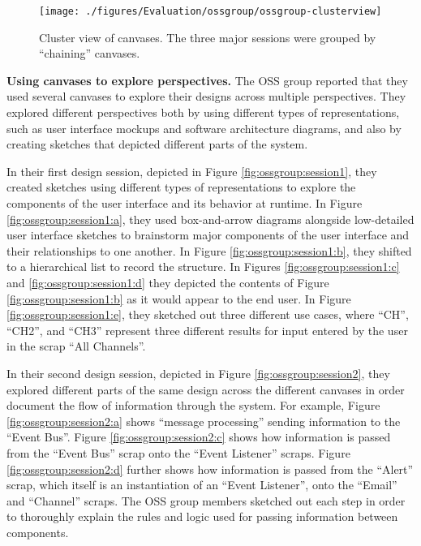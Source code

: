 \begin{figure}%
  \centering
  \texttt{[image: ./figures/Evaluation/ossgroup/ossgroup-clusterview]}
   \caption {Cluster view of canvases. The three major sessions were grouped by ``chaining'' canvases.}
   \label{fig:ossgroup:clusterview}   
\end{figure}%

\textbf{Using canvases to explore perspectives.} The OSS group reported that they used several canvases to explore their designs across multiple perspectives. They explored different perspectives both by using different types of representations, such as user interface mockups and software architecture diagrams, and also by creating sketches that depicted different parts of the system. 

In their first design session, depicted in Figure \ref{fig:ossgroup:session1}, they created sketches using different types of representations to explore the components of the user interface and its behavior at runtime. In Figure \ref{fig:ossgroup:session1:a}, they used box-and-arrow diagrams alongside low-detailed user interface sketches to brainstorm major components of the user interface and their relationships to one another. In Figure \ref{fig:ossgroup:session1:b}, they shifted to a hierarchical list to record the structure. In Figures \ref{fig:ossgroup:session1:c} and \ref{fig:ossgroup:session1:d} they depicted the contents of Figure \ref{fig:ossgroup:session1:b} as it would appear to the end user. In Figure \ref{fig:ossgroup:session1:e}, they sketched out three different use cases, where ``CH'', ``CH2'', and ``CH3'' represent three different results for input entered by the user in the scrap ``All Channels''.

In their second design session, depicted in Figure \ref{fig:ossgroup:session2}, they explored different parts of the same design across the different canvases in order document the flow of information through the system. For example, Figure \ref{fig:ossgroup:session2:a} shows ``message processing'' sending information to the ``Event Bus''. Figure \ref{fig:ossgroup:session2:c} shows how information is passed from the ``Event Bus'' scrap onto the ``Event Listener'' scraps. Figure \ref{fig:ossgroup:session2:d} further shows how information is passed from the ``Alert'' scrap, which itself is an instantiation of an ``Event Listener'', onto the ``Email'' and ``Channel'' scraps. The OSS group members sketched out each step in order to thoroughly explain the rules and logic used for passing information between components. 

